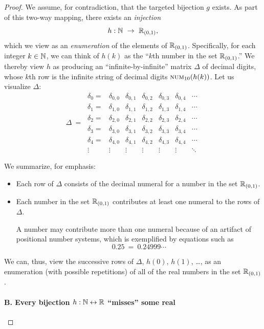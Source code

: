 \begin{proof}
We assume, for contradiction, that the targeted bijection $g$ exists.
As part of this two-way mapping, there exists an {\em injection}
\[ 
h: \N \ \rightarrow \ \R_{(0,1)},
\]
which we view as an {\em enumeration} of the elements of $\mathbb{R}_{(0,1)}$.
Specifically, for each integer $k \in \mathbb{N}$, we can think of $h(k)$ as
the ``$k$th number in the set $\mathbb{R}_{(0,1)}$.''  We thereby view $h$ as
producing an ``infinite-by-infinite'' matrix $\Delta$ of decimal
digits, whose $k$th row is the infinite string of decimal digits
$\mbox{\sc num}_{10}(h(k))$.  Let us visualize $\Delta$:
\[ \Delta \ = \
\begin{array}{ccccccc}
\delta_0 = &
\delta_{0,0} & \delta_{0,1} & \delta_{0,2} & \delta_{0,3} &
	\delta_{0,4} & \cdots \\
\delta_1 = &
\delta_{1,0} & \delta_{1,1} & \delta_{1,2} & \delta_{1,3} &
	\delta_{1,4} & \cdots \\
\delta_2 = &
\delta_{2,0} & \delta_{2,1} & \delta_{2,2} & \delta_{2,3} &
	\delta_{2,4} & \cdots \\
\delta_3 = &
\delta_{3,0} & \delta_{3,1} & \delta_{3,2} & \delta_{3,3} &
	\delta_{3,4} & \cdots \\ 
\delta_4 = &
\delta_{4,0} & \delta_{4,1} & \delta_{4,2} & \delta_{4,3} &
	\delta_{4,4} & \cdots \\ 
\vdots &
\vdots  & \vdots  & \vdots  & \vdots  & \vdots  & \ddots
\end{array}
\]

\noindent We summarize, for emphasis:
\begin{itemize}
\item
Each row of $\Delta$ consists of the decimal numeral for a number in
the set $\mathbb{R}_{(0,1)}$.

\item
Each number in the set $\mathbb{R}_{(0,1)}$ contributes at least one numeral
to the rows of $\Delta$.

A number may contribute more than one numeral because of an artifact
of positional number systems, which is exemplified by equations such
as
\[ 0.25 \ = \ 0.24999\cdots \]
\end{itemize}
We can, thus, view the successive rows of $\Delta$, $h(0)$, $h(1)$,
\ldots, as an enumeration (with possible repetitions) of all of the
real numbers in the set $\mathbb{R}_{(0,1)}$.

\paragraph{\small\sf B. Every bijection $h: \mathbb{N} \leftrightarrow \mathbb{R}$
  ``misses'' some real}


\end{proof}
